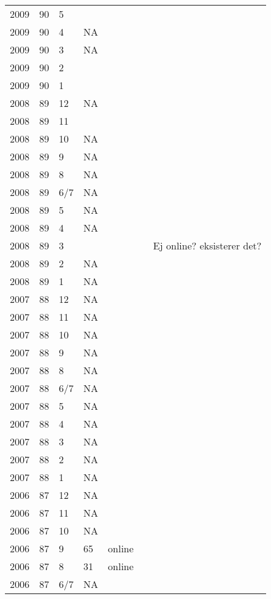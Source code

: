 \begin{longtable}{ |l|l|l|l|p{2.7cm}|l|p{2cm}| }
 2009 & 90 &     5 &         &  &  & \\
 2009 & 90 &     4 &      NA &  &  & \\
 2009 & 90 &     3 &      NA &  &  & \\
 2009 & 90 &     2 &         &  &  & \\
 2009 & 90 &     1 &         &  &  & \\
 2008 & 89 &    12 &      NA &  &  & \\
 2008 & 89 &    11 &         &  &  & \\
 2008 & 89 &    10 &      NA &  &  & \\
 2008 & 89 &     9 &      NA &  &  & \\
 2008 & 89 &     8 &      NA &  &  & \\
 2008 & 89 &   6/7 &      NA &  &  & \\
 2008 & 89 &     5 &      NA &  &  & \\
 2008 & 89 &     4 &      NA &  &  & \\
 2008 & 89 &     3 &         &  &  & Ej online? eksisterer det?\\
 2008 & 89 &     2 &      NA &  &  & \\
 2008 & 89 &     1 &      NA &  &  & \\
 2007 & 88 &    12 &      NA &  &  & \\
 2007 & 88 &    11 &      NA &  &  & \\
 2007 & 88 &    10 &      NA &  &  & \\
 2007 & 88 &     9 &      NA &  &  & \\
 2007 & 88 &     8 &      NA &  &  & \\
 2007 & 88 &   6/7 &      NA &  &  & \\
 2007 & 88 &     5 &      NA &  &  & \\
 2007 & 88 &     4 &      NA &  &  & \\
 2007 & 88 &     3 &      NA &  &  & \\
 2007 & 88 &     2 &      NA &  &  & \\
 2007 & 88 &     1 &      NA &  &  & \\
 2006 & 87 &    12 &      NA &  &  & \\
 2006 & 87 &    11 &      NA &  &  & \\
 2006 & 87 &    10 &      NA &  &  & \\
 2006 & 87 &     9 &      65 & online &  & \\
 2006 & 87 &     8 &      31 & online &  & \\
 2006 & 87 &   6/7 &      NA &  &  & \\

\end{longtable}
